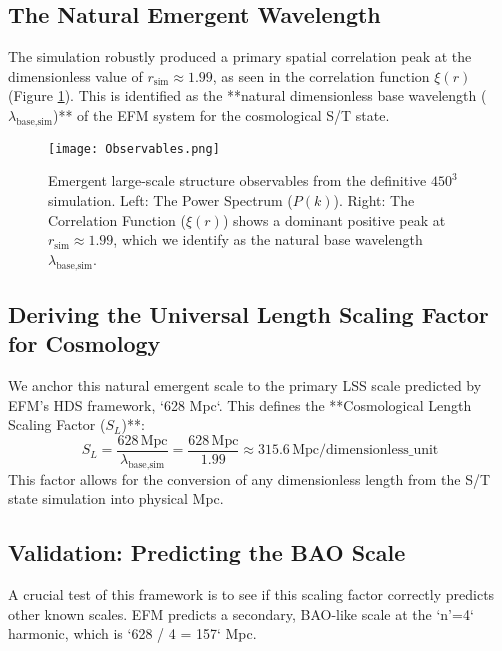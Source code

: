 \documentclass[11pt]{article}
\begin{document}
\subsection{The Natural Emergent Wavelength}
The simulation robustly produced a primary spatial correlation peak at the dimensionless value of \(r_{\text{sim}} \approx 1.99\), as seen in the correlation function \(\xi(r)\) (Figure \ref{fig:lss_observables}). This is identified as the **natural dimensionless base wavelength (\(\lambda_{\text{base,sim}}\))** of the EFM system for the cosmological S/T state.

\begin{figure}[h!]
\centering
\texttt{[image: Observables.png]}
\caption{Emergent large-scale structure observables from the definitive \(450^3\) simulation. Left: The Power Spectrum (\(P(k)\)). Right: The Correlation Function (\(\xi(r)\)) shows a dominant positive peak at \(r_{\text{sim}} \approx 1.99\), which we identify as the natural base wavelength \(\lambda_{\text{base,sim}}\).}
\label{fig:lss_observables}
\end{figure}

\subsection{Deriving the Universal Length Scaling Factor for Cosmology}
We anchor this natural emergent scale to the primary LSS scale predicted by EFM's HDS framework, `628 Mpc`. This defines the **Cosmological Length Scaling Factor ($S_L$)**:
\begin{equation}
S_L = \frac{628 \, \text{Mpc}}{\lambda_{\text{base,sim}}} = \frac{628 \, \text{Mpc}}{1.99} \approx 315.6 \, \text{Mpc}/\text{dimensionless\_unit}
\end{equation}
This factor allows for the conversion of any dimensionless length from the S/T state simulation into physical Mpc.

\subsection{Validation: Predicting the BAO Scale}
A crucial test of this framework is to see if this scaling factor correctly predicts other known scales. EFM predicts a secondary, BAO-like scale at the `n'=4` harmonic, which is `628 / 4 = 157` Mpc.
\end{document}

